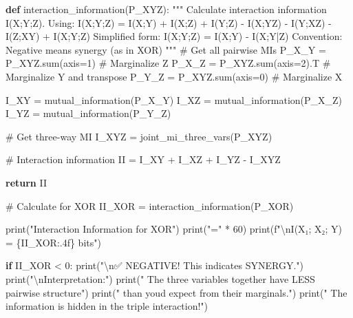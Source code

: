 \documentclass[
  11pt,
  letterpaper,
  oneside,
  openany]{book}
\newenvironment{Shaded}{\begin{snugshade}}{\end{snugshade}}
\newcommand{\BuiltInTok}[1]{\textcolor[rgb]{0.00,0.23,0.31}{#1}}
\newcommand{\CharTok}[1]{\textcolor[rgb]{0.13,0.47,0.30}{#1}}
\newcommand{\CommentTok}[1]{\textcolor[rgb]{0.37,0.37,0.37}{#1}}
\newcommand{\ControlFlowTok}[1]{\textcolor[rgb]{0.00,0.23,0.31}{\textbf{#1}}}
\newcommand{\DecValTok}[1]{\textcolor[rgb]{0.68,0.00,0.00}{#1}}
\newcommand{\KeywordTok}[1]{\textcolor[rgb]{0.00,0.23,0.31}{\textbf{#1}}}
\newcommand{\NormalTok}[1]{\textcolor[rgb]{0.00,0.23,0.31}{#1}}
\newcommand{\OperatorTok}[1]{\textcolor[rgb]{0.37,0.37,0.37}{#1}}
\newcommand{\SpecialCharTok}[1]{\textcolor[rgb]{0.37,0.37,0.37}{#1}}
\newcommand{\SpecialStringTok}[1]{\textcolor[rgb]{0.13,0.47,0.30}{#1}}
\newcommand{\StringTok}[1]{\textcolor[rgb]{0.13,0.47,0.30}{#1}}
\begin{document}
\begin{Shaded}
\begin{Highlighting}[]
\KeywordTok{def}\NormalTok{ interaction\_information(P\_XYZ):}
    \CommentTok{"""}
\CommentTok{    Calculate interaction information I(X;Y;Z).}
\CommentTok{    }
\CommentTok{    Using: I(X;Y;Z) = I(X;Y) + I(X;Z) + I(Y;Z) {-} I(X;YZ) {-} I(Y;XZ) {-} I(Z;XY) + I(X;Y;Z)}
\CommentTok{    }
\CommentTok{    Simplified form:}
\CommentTok{    I(X;Y;Z) = I(X;Y) {-} I(X;Y|Z)}
\CommentTok{    }
\CommentTok{    Convention: Negative means synergy (as in XOR)}
\CommentTok{    """}
    \CommentTok{\# Get all pairwise MIs}
\NormalTok{    P\_X\_Y }\OperatorTok{=}\NormalTok{ P\_XYZ.}\BuiltInTok{sum}\NormalTok{(axis}\OperatorTok{=}\DecValTok{1}\NormalTok{)  }\CommentTok{\# Marginalize Z}
\NormalTok{    P\_X\_Z }\OperatorTok{=}\NormalTok{ P\_XYZ.}\BuiltInTok{sum}\NormalTok{(axis}\OperatorTok{=}\DecValTok{2}\NormalTok{).T  }\CommentTok{\# Marginalize Y and transpose}
\NormalTok{    P\_Y\_Z }\OperatorTok{=}\NormalTok{ P\_XYZ.}\BuiltInTok{sum}\NormalTok{(axis}\OperatorTok{=}\DecValTok{0}\NormalTok{)  }\CommentTok{\# Marginalize X}
    
\NormalTok{    I\_XY }\OperatorTok{=}\NormalTok{ mutual\_information(P\_X\_Y)}
\NormalTok{    I\_XZ }\OperatorTok{=}\NormalTok{ mutual\_information(P\_X\_Z)}
\NormalTok{    I\_YZ }\OperatorTok{=}\NormalTok{ mutual\_information(P\_Y\_Z)}
    
    \CommentTok{\# Get three{-}way MI}
\NormalTok{    I\_XYZ }\OperatorTok{=}\NormalTok{ joint\_mi\_three\_vars(P\_XYZ)}
    
    \CommentTok{\# Interaction information}
\NormalTok{    II }\OperatorTok{=}\NormalTok{ I\_XY }\OperatorTok{+}\NormalTok{ I\_XZ }\OperatorTok{+}\NormalTok{ I\_YZ }\OperatorTok{{-}}\NormalTok{ I\_XYZ}
    
    \ControlFlowTok{return}\NormalTok{ II}

\CommentTok{\# Calculate for XOR}
\NormalTok{II\_XOR }\OperatorTok{=}\NormalTok{ interaction\_information(P\_XOR)}

\BuiltInTok{print}\NormalTok{(}\StringTok{"Interaction Information for XOR"}\NormalTok{)}
\BuiltInTok{print}\NormalTok{(}\StringTok{"="} \OperatorTok{*} \DecValTok{60}\NormalTok{)}
\BuiltInTok{print}\NormalTok{(}\SpecialStringTok{f"}\CharTok{\textbackslash{}n}\SpecialStringTok{I(X₁; X₂; Y) = }\SpecialCharTok{\{}\NormalTok{II\_XOR}\SpecialCharTok{:.4f\}}\SpecialStringTok{ bits"}\NormalTok{)}

\ControlFlowTok{if}\NormalTok{ II\_XOR }\OperatorTok{\textless{}} \DecValTok{0}\NormalTok{:}
    \BuiltInTok{print}\NormalTok{(}\StringTok{"}\CharTok{\textbackslash{}n}\StringTok{✅ NEGATIVE! This indicates SYNERGY."}\NormalTok{)}
    \BuiltInTok{print}\NormalTok{(}\StringTok{"}\CharTok{\textbackslash{}n}\StringTok{Interpretation:"}\NormalTok{)}
    \BuiltInTok{print}\NormalTok{(}\StringTok{"  The three variables together have LESS pairwise structure"}\NormalTok{)}
    \BuiltInTok{print}\NormalTok{(}\StringTok{"  than you\textquotesingle{}d expect from their marginals."}\NormalTok{)}
    \BuiltInTok{print}\NormalTok{(}\StringTok{"  The information is \textquotesingle{}hidden\textquotesingle{} in the triple interaction!"}\NormalTok{)}
    

\end{Highlighting}
\end{Shaded}
\end{document}
